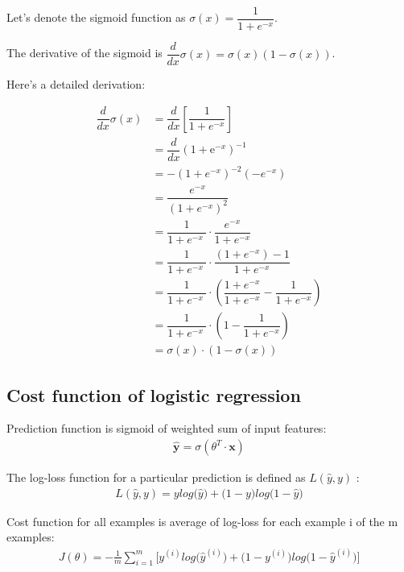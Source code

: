 \documentclass[10pt,a4paper]{article}
\begin{document}
	Let's denote the sigmoid function as $\sigma(x) = \dfrac{1}{1 + e^{-x}}$.
	
	The derivative of the sigmoid is $\dfrac{d}{dx}\sigma(x) = \sigma(x)(1 - \sigma(x))$.
	
	Here's a detailed derivation:
	
	
	\begin{align}
	\dfrac{d}{dx} \sigma(x) &= \dfrac{d}{dx} \left[ \dfrac{1}{1 + e^{-x}} \right] \\
	&= \dfrac{d}{dx} \left( 1 + \mathrm{e}^{-x} \right)^{-1} \\
	&= -(1 + e^{-x})^{-2}(-e^{-x}) \\
	&= \dfrac{e^{-x}}{\left(1 + e^{-x}\right)^2} \\
	&= \dfrac{1}{1 + e^{-x}\ } \cdot \dfrac{e^{-x}}{1 + e^{-x}}  \\
	&= \dfrac{1}{1 + e^{-x}\ } \cdot \dfrac{(1 + e^{-x}) - 1}{1 + e^{-x}}  \\
	&= \dfrac{1}{1 + e^{-x}\ } \cdot \left( \dfrac{1 + e^{-x}}{1 + e^{-x}} - \dfrac{1}{1 + e^{-x}} \right) \\
	&= \dfrac{1}{1 + e^{-x}\ } \cdot \left( 1 - \dfrac{1}{1 + e^{-x}} \right) \\
	&= \sigma(x) \cdot (1 - \sigma(x))
	\end{align}
	
	\subsection{Cost function of logistic regression}
	
	Prediction function is sigmoid of weighted sum of input features:
	\begin{align}
		\bm{\hat{y}} = \sigma (\theta^T\cdot \bm{x})
	\end{align}
	
	The log-loss function for a particular prediction is defined as $L(\hat{y},y)$ :
	\begin{align}
		L(\hat{y}, y) = y log\big(\hat{y}\big) + 
		\big(1 - y\big)log\big(1 - \hat{y}\big)
	\end{align}
	
	Cost function for all examples is average of log-loss for each example i of the m examples:
	\begin{align}
		J(\theta) = - \frac{1}{m} \sum_{i=1}^{m} \big[ y^{(i)} log\big(\hat{y}^{(i)}\big) + 
		\big(1 - y^{(i)}\big)log\big(1 - \hat{y}^{(i)}\big)
		\big]
	\end{align}
	
\end{document}
